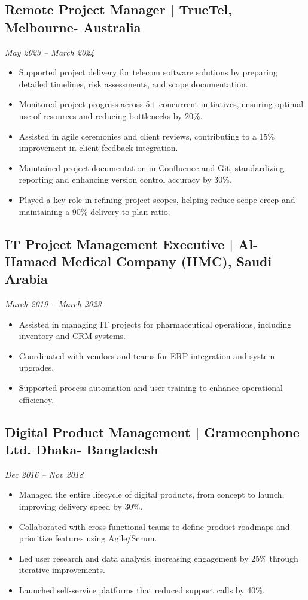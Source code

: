 \documentclass[a4paper,10pt]{article}
\begin{document}
\subsection*{\textbf{Remote Project Manager} | TrueTel, Melbourne- Australia}
\textit{May 2023 – March 2024} \\
\begin{itemize}
    \item Supported project delivery for telecom software solutions by preparing detailed timelines, risk assessments, and scope documentation.
    \item Monitored project progress across 5+ concurrent initiatives, ensuring optimal use of resources and reducing bottlenecks by 20\%.
    \item Assisted in agile ceremonies and client reviews, contributing to a 15\% improvement in client feedback integration.
    \item Maintained project documentation in Confluence and Git, standardizing reporting and enhancing version control accuracy by 30\%.
    \item Played a key role in refining project scopes, helping reduce scope creep and maintaining a 90\% delivery-to-plan ratio. 
\end{itemize}

\subsection*{\textbf{IT Project Management Executive} | Al-Hamaed Medical Company (HMC), Saudi Arabia}
\textit{March 2019 – March 2023} \\

\begin{itemize}
    \item Assisted in managing IT projects for pharmaceutical operations, including inventory and CRM systems.
    \item Coordinated with vendors and teams for ERP integration and system upgrades.
    \item Supported process automation and user training to enhance operational efficiency. 
\end{itemize}

\subsection*{\textbf{Digital Product Management} | Grameenphone Ltd. Dhaka- Bangladesh}
\textit{Dec 2016 – Nov 2018} \\
\begin{itemize}

    \item Managed the entire lifecycle of digital products, from concept to launch, improving delivery speed by 30\%.
    \item Collaborated with cross-functional teams to define product roadmaps and prioritize features using Agile/Scrum.
    \item Led user research and data analysis, increasing engagement by 25\% through iterative improvements.
    \item Launched self-service platforms that reduced support calls by 40\%. 
\end{itemize}
\end{document}
